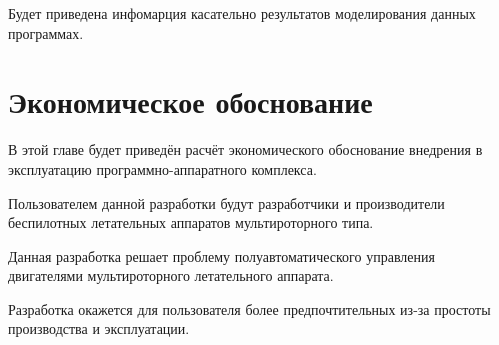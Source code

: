 \documentclass[a4paper]{bsuir-std}
\begin{document}
Будет приведена инфомарция касательно результатов моделирования данных
программах.

\section{Экономическое обоснование}

В этой главе будет приведён расчёт экономического обоснование
внедрения в эксплуатацию программно-аппаратного комплекса.

Пользователем данной разработки будут разработчики и производители
беспилотных летательных аппаратов мультироторного типа.

Данная разработка решает проблему полуавтоматического управления
двигателями мультироторного летательного аппарата.

Разработка окажется для пользователя более предпочтительных из-за
простоты производства и эксплуатации.

\newpage

\end{document}
